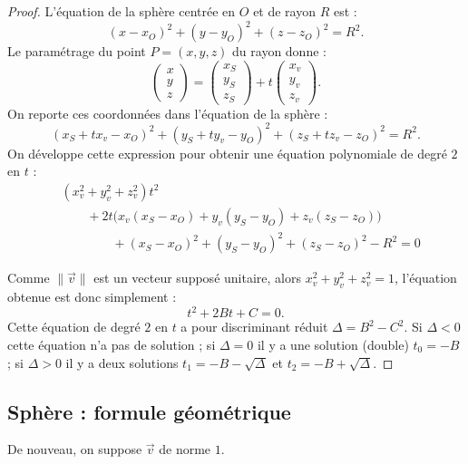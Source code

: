 \documentclass[11pt,class=report,crop=false]{standalone}
\begin{document}
\begin{proof}
L'équation de la sphère centrée en $O$ et de rayon $R$ est :
$$(x-x_O)^2 + (y-y_O)^2 +(z-z_O)^2 = R^2.$$
Le paramétrage du point $P=(x,y,z)$ du rayon donne :
$$
\begin{pmatrix}x\\y\\z\end{pmatrix}
= \begin{pmatrix}x_S\\y_S\\z_S\end{pmatrix} + t \begin{pmatrix}x_v\\y_v\\z_v\end{pmatrix}
.$$
On reporte ces coordonnées dans l'équation de la sphère :
$$(x_S + tx_v -x_O)^2 + (y_S + ty_v -y_O)^2 + (z_S + tz_v -z_O)^2  = R^2.$$
On développe cette expression pour obtenir une équation polynomiale de degré $2$ en $t$ :
\begin{align*}
& (x_v^2 + y_v^2 +z_v^2) t^2 \\
& \qquad + 2t \big(x_v(x_S-x_O) + y_v(y_S-y_O) + z_v(z_S-z_O) \big) \\
& \qquad\qquad + (x_S-x_O)^2 + (y_S-y_O)^2 + (z_S-z_O)^2 - R^2 = 0
\end{align*}

Comme $\|\vec v\|$ est un vecteur supposé unitaire, alors $x_v^2 + y_v^2 +z_v^2 = 1$, l'équation obtenue est donc simplement :
$$t^2 +2Bt+C = 0.$$
Cette équation de degré $2$ en $t$ a pour discriminant réduit $\Delta = B^2-C^2$.
Si $\Delta < 0$ cette équation n'a pas de solution ; si $\Delta=0$ il y a une solution (double) $t_0 = -B$ ; si $\Delta>0$ il y a deux solutions $t_1 = -B - \sqrt{\Delta}$ et $t_2 = -B + \sqrt{\Delta}$.
\end{proof}

\subsection{Sphère : formule géométrique}

De nouveau, on suppose $\vec v$ de norme $1$.
\end{document}
